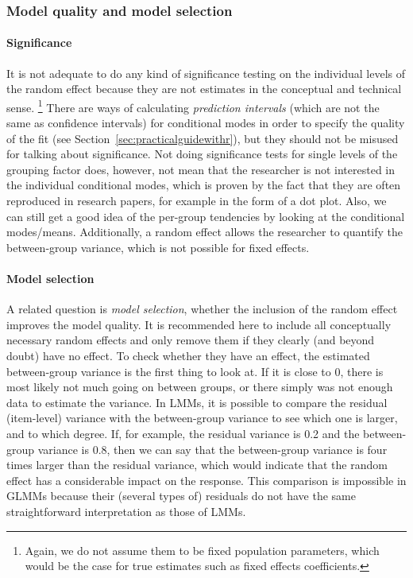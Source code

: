 \subsubsection{Model quality and model selection}
\label{sec:significancetestingandcoefficientsofdetermination}

\paragraph{Significance}

It is not adequate to do any kind of significance testing on the individual levels of the random effect because they are not estimates in the conceptual and technical sense.%
\footnote{Again, we do not assume them to be fixed population parameters, which would be the case for true estimates such as fixed effects coefficients.}
There are ways of calculating \textit{prediction intervals} (which are not the same as confidence intervals) for conditional modes in order to specify the quality of the fit (see Section~\ref{sec:practicalguidewithr}), but they should not be misused for talking about significance.
Not doing significance tests for single levels of the grouping factor does, however, not mean that the researcher is not interested in the individual conditional modes, which is proven by the fact that they are often reproduced in research papers, for example in the form of a dot plot.
Also, we can still get a good idea of the per-group tendencies by looking at the conditional modes\slash means.
Additionally, a random effect allows the researcher to quantify the between-group variance, which is not possible for fixed effects.

\paragraph{Model selection}

A related question is \textit{model selection}, \ie whether the inclusion of the random effect improves the model quality.
It is recommended here to include all conceptually necessary random effects and only remove them if they clearly (and beyond doubt) have no effect.
To check whether they have an effect, the estimated between-group variance is the first thing to look at.
If it is close to $0$, there is most likely not much going on between groups, or there simply was not enough data to estimate the variance.
In LMMs, it is possible to compare the residual (item-level) variance with the between-group variance to see which one is larger, and to which degree.
If, for example, the residual variance is 0.2 and the between-group variance is 0.8, then we can say that the between-group variance is four times larger than the residual variance, which would indicate that the random effect has a considerable impact on the response.
This comparison is impossible in GLMMs because their (several types of) residuals do not have the same straightforward interpretation as those of LMMs.

